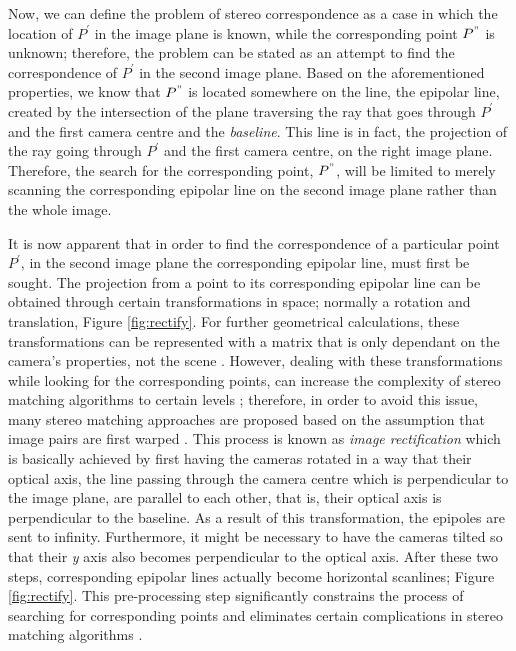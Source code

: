 Now, we can define the problem of stereo correspondence as a case in which the location of $P^{'}$ in the image plane is known, while the
corresponding point $P^{"}$ is unknown; therefore, the problem can be stated as an attempt to find the correspondence of $P^{'}$ in the second image plane. Based on the aforementioned 
properties, we know that $P^{"}$ is located somewhere on the line, the epipolar line,
created by the intersection of the plane traversing the ray that goes through $P^{'}$ and the first camera centre and the {\it baseline}. This line is in fact, the projection of the ray going
through $P^{'}$ and the first camera centre, on the right image plane. Therefore, the search for the corresponding point, $P^{"}$, will be limited to merely scanning the corresponding 
epipolar line on the second image plane rather than the whole image.


It is now apparent that in order to find the correspondence of a particular point $P^{'}$, in the second image plane
the corresponding epipolar line, must first be sought. 
The projection from a point to its corresponding epipolar line can be obtained through certain transformations in space; normally a rotation and translation, Figure \ref{fig:rectify}.
For further geometrical calculations, these transformations can be represented
with a matrix that is only dependant on the camera's properties, not the scene \cite{hart2000}.
However, dealing with these transformations while looking for the corresponding points, can increase the complexity of stereo matching algorithms to certain levels \cite{sze11}; therefore, 
in order to avoid this issue, many stereo matching approaches are proposed based on the assumption that image pairs are first warped \cite{sze11}.
This process is known as {\it image rectification} which is basically achieved by first having the cameras rotated in a way that their optical axis, 
the line passing through the camera centre which is perpendicular to the image plane, are parallel to each other,
that is, their optical axis is perpendicular to the baseline. As a result of this transformation, the epipoles are sent to infinity. 
Furthermore, it might be necessary to have the cameras tilted so that their {\it y} axis also becomes perpendicular to the optical axis. 
After these two steps, corresponding epipolar lines actually become horizontal scanlines; Figure \ref{fig:rectify}. This pre-processing step significantly constrains the process of searching 
for corresponding points and eliminates certain complications in stereo matching algorithms \cite{sze11}.

